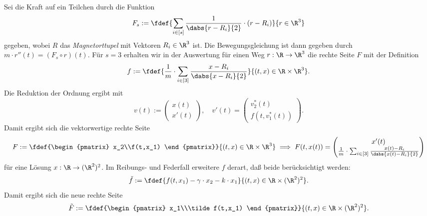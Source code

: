\documentclass{article}
\begin{document}
    \aufgabe{}
        \subaufgabe{}
            Sei die Kraft auf ein Teilchen durch die Funktion
            \[F_s:=\fdef{\sum_{i\in[s]}\frac{1}{\dabs{r - R_i}{2}}\cdot (r-R_i)}{r\in\R^3}\]
            gegeben, wobei $R$ das \emph{Magnetorttupel} mit Vektoren $R_i\in\R^3$ ist. Die Bewegungsgleichung ist dann gegeben durch $m\cdot r''(t) = (F_s\circ r)(t)$. Für $s = 3$ erhalten wir in der Auswertung für einen Weg $r:\R\to\R^3$ die rechte Seite $F$ mit der Definition
            \[f:=\fdef{\frac{1}{m}\cdot\sum_{i\in[3]}\frac{x-R_i}{\dabs{x-R_i}{2}}}{(t,x)\in\R\times\R^3}.\]
            Die Reduktion der Ordnung ergibt mit
            \[v(t):=\begin{pmatrix}
                x(t)\\x'(t)
            \end{pmatrix},\quad v'(t)=\begin{pmatrix}
                v_2^*(t)\\f(t,v_1^*(t))
            \end{pmatrix}.\]
            Damit ergibt sich die vektorwertige rechte Seite
            \[F:=\fdef{\begin{pmatrix}
                x_2\\f(t,x_1)
            \end{pmatrix}}{(t,x)\in\R\times\R^3}\implies F(t,x(t)) = \begin{pmatrix}
                x'(t)\\\frac{1}{m}\cdot\sum_{i\in[3]}\frac{x(t)-R_i}{\dabs{x(t)-R_i}{2}}
            \end{pmatrix}\]
            für eine Lösung $x:\R\to(\R^2)^2$. Im Reibungs- und Federfall erweitere $f$ derart, daß beide berücksichtigt werden:
            \[\tilde f:=\fdef{f(t,x_1) - \gamma\cdot x_2 - k\cdot x_1}{(t,x)\in\R\times(\R^2)^2}.\]
            Damit ergibt sich die neue rechte Seite
            \[\tilde F:=\fdef{\begin{pmatrix}
                x_1\\\tilde f(t,x_1)
            \end{pmatrix}}{(t,x)\in\R\times(\R^2)^2}.\]

        \subaufgabe{}
        
        \subaufgabe{}

        \subaufgabe{}

        \subaufgabe{}

        \subaufgabe{}
        
\end{document}
